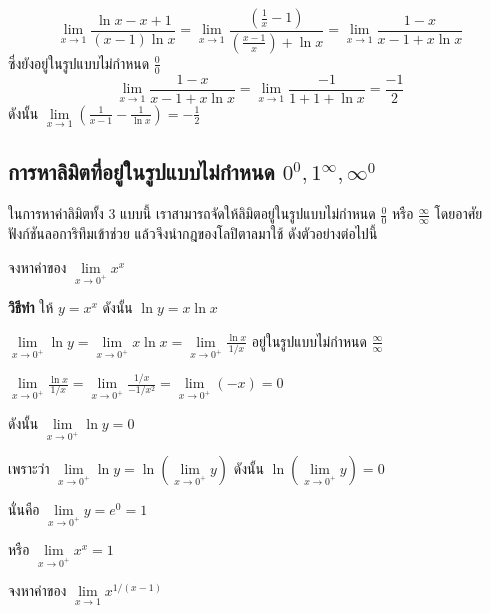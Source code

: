 \documentclass[
]{book}
\begin{document}
\[\displaystyle \mathop {\lim }\limits_{x\to 1} \frac{\ln x-x+1}{(x-1)\ln 
x}=\mathop {\lim 
}\limits_{x\to 1} \frac{(\frac{1}{x}-1)}{(\frac{x-1}{x})+\ln x}=\mathop 
{\lim }\limits_{x\to 1} \frac{1-x}{x-1+x\ln x}\] ซึ่งยังอยู่ในรูปแบบไม่กำหนด
\(\displaystyle \frac{0}{0}\)
\[\displaystyle \mathop {\lim }\limits_{x\to 1} \frac{1-x}{x-1+x\ln 
x}=\mathop {\lim 
}\limits_{x\to 1} \frac{-1}{1+1+\ln x}=\frac{-1}{2}\] ดังนั้น
\(\displaystyle \mathop {\lim }\limits_{x\to 1}
(\frac{1}{x-1}-\frac{1}{\ln
x})=-\frac{1}{2}\)

\subsection{\texorpdfstring{การหาลิมิตที่อยู่ในรูปแบบไม่กำหนด
\(0^{0}, 1^{\infty}, \infty^0\)}{การหาลิมิตที่อยู่ในรูปแบบไม่กำหนด 0\^{}\{0\}, 1\^{}\{\textbackslash infty\}, \textbackslash infty\^{}0}}\label{uxe01uxe32uxe23uxe2buxe32uxe25uxe21uxe15uxe17uxe2duxe22uxe43uxe19uxe23uxe1buxe41uxe1auxe1auxe44uxe21uxe01uxe33uxe2buxe19uxe14-00-1infty-infty0}

ในการหาค่าลิมิตทั้ง 3 แบบนี้ เราสามารถจัดให้ลิมิตอยู่ในรูปแบบไม่กำหนด
\(\displaystyle \frac{0}{0}\) หรือ
\(\displaystyle \frac{\infty }{\infty }\) โดยอาศัยฟังก์ชันลอการิทึมเข้าช่วย
แล้วจึงนำกฎของโลปิตาลมาใช้ ดังตัวอย่างต่อไปนี้

จงหาค่าของ \(\mathop {\lim }\limits_{x\to 0^+} x^x\)

\textbf{วิธีทำ} ให้ \(y=x^x\) ดังนั้น \(\ln y=x\ln x\)

\(\displaystyle \mathop {\lim }\limits_{x\to 0^+} \ln y=\mathop {\lim
}\limits_{x\to 0^+}
x\ln x=\mathop {\lim }\limits_{x\to 0^+} \frac{\ln x}{1/x}\)
อยู่ในรูปแบบไม่กำหนด \(\displaystyle \frac{\infty }{\infty }\)

\(\displaystyle \mathop {\lim }\limits_{x\to 0^+} \frac{\ln x}{1/x}=\mathop
{\lim
}\limits_{x\to 0^+} \frac{1/x}{-1/x^2}=\mathop {\lim }\limits_{x\to 0^+}
(-x)=0\)

ดังนั้น \(\mathop {\lim }\limits_{x\to 0^+} \ln y=0\)

เพราะว่า \(\mathop {\lim }\limits_{x\to 0^+} \ln y=\ln (\mathop {\lim
}\limits_{x\to 0^+} y)\) ดังนั้น \(\ln (\mathop {\lim }\limits_{x\to 0^+}
y)=0\)

นั่นคือ \(\mathop {\lim }\limits_{x\to 0^+} y=e^0=1\)

หรือ \(\mathop {\lim }\limits_{x\to 0^+} x^x=1\)

จงหาค่าของ \(\mathop {\lim }\limits_{x\to 1} x^{1/(x-1)}\)
\end{document}
